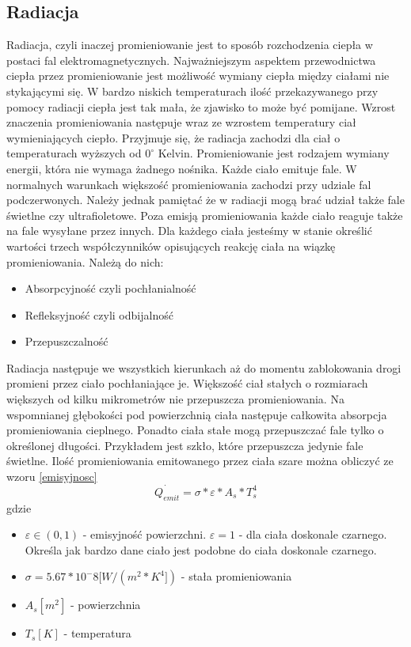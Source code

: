 \subsection {Radiacja}
\label{Radiacja}
Radiacja, czyli inaczej promieniowanie jest to sposób rozchodzenia ciepła w postaci fal elektromagnetycznych. 
Najważniejszym aspektem przewodnictwa ciepła przez promieniowanie jest możliwość wymiany ciepła między ciałami
nie stykającymi się.
W bardzo niskich temperaturach ilość przekazywanego przy pomocy radiacji ciepła jest tak mała, że zjawisko to może być pomijane.
Wzrost znaczenia promieniowania następuje wraz ze wzrostem temperatury ciał wymieniających ciepło.
Przyjmuje się, że radiacja zachodzi dla ciał o temperaturach wyższych od $0 ^\circ$ Kelvin.
Promieniowanie jest rodzajem wymiany energii, która nie wymaga żadnego nośnika. Każde ciało emituje fale.
W normalnych warunkach większość promieniowania zachodzi przy udziale fal podczerwonych. Należy jednak pamiętać
że w radiacji mogą brać udział także fale świetlne czy ultrafioletowe. Poza emisją promieniowania każde ciało reaguje także
na fale wysyłane przez innych. Dla każdego ciała jesteśmy w stanie określić wartości trzech współczynników opisujących 
reakcję ciała na wiązkę promieniowania. Należą do nich:
\begin {itemize}
\item Absorpcyjność czyli pochłanialność
\item Refleksyjność czyli odbijalność
\item Przepuszczalność
\end {itemize}
Radiacja następuje we wszystkich kierunkach aż  do momentu zablokowania drogi promieni przez ciało pochłaniające je.
Większość ciał stałych o rozmiarach większych od kilku mikrometrów nie przepuszcza promieniowania. Na wspomnianej 
głębokości pod powierzchnią ciała następuje całkowita absorpcja promieniowania cieplnego. Ponadto ciała stałe mogą przepuszczać
fale tylko o określonej długości. Przykładem jest szkło, które przepuszcza jedynie fale świetlne.
Ilość promieniowania emitowanego przez ciała szare można obliczyć ze wzoru \ref{emisyjnosc}
\begin {equation}
\dot{Q_{emit}}=\sigma*\varepsilon*A_{s}*T_{s}^4
\label {emisyjnosc}
\end {equation}
gdzie
\begin{itemize}
\item $\varepsilon \in (0,1)$ - emisyjność powierzchni. $\varepsilon=1$ - dla ciała doskonale czarnego. Określa jak bardzo dane 
ciało jest podobne do ciała doskonale czarnego.
\item $\sigma = 5.67 * 10^-8 [W/(m^2 * K^4]) $ - stała promieniowania
\item $A_{s} [m^2]$ - powierzchnia 
\item $T_{s} [K]$ - temperatura
\end {itemize}
